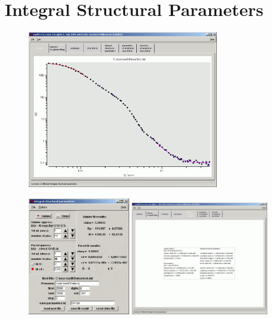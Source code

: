 \clearpage
\section{Integral Structural Parameters}

\begin{figure}[htb]
\begin{center}
\includegraphics[width=0.75\textwidth]{integralparameter1.png}\end{center}
\caption{} \label{integralparameters1}
\end{figure}

\begin{figure}[htb]
\begin{center}
\includegraphics[width=0.4\textwidth]{integralparameter2.png}
\includegraphics[width=0.54\textwidth]{integralparameter3.png}
\end{center}
\caption{} \label{integralparameters23}
\end{figure}
